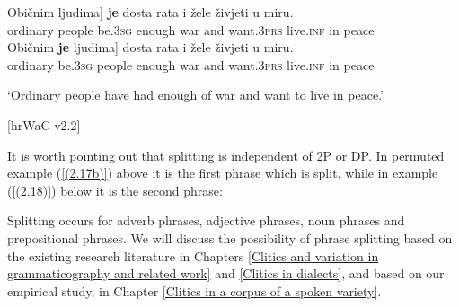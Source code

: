 \begin{exe}\ex
\begin{xlist}
\ex\label{(2.17a)}
\gll \minsp{[} Običnim ljudima] \textbf{je} dosta rata i žele živjeti u miru.  \\
{} ordinary people be\textsc{.3sg} enough war and want\textsc{.3prs} live\textsc{.inf} in peace \\
\ex\label{(2.17b)}
\gll \minsp{[} Običnim \textbf{je} ljudima] dosta rata i žele živjeti u miru.  \\
{} ordinary be\textsc{.3sg} people enough war and want\textsc{.3prs} live\textsc{.inf} in peace \\
\end{xlist}
\glt ‘Ordinary people have had enough of war and want to live in peace.’ \\
\strut\hfill [hrWaC v2.2]
\end{exe}

\noindent It is worth pointing out that splitting is independent of 2P or DP. In permuted example (\ref{(2.17b)}) above it is the first phrase which is split, while in example (\ref{(2.18)}) below it is the second phrase:


\noindent Splitting occurs for adverb phrases, adjective phrases, noun phrases and prepositional phrases. We will discuss the possibility of phrase splitting based on the existing research literature in Chapters \ref{Clitics and variation in grammaticography and related work} and \ref{Clitics in dialects}, and based on our empirical study, in Chapter \ref{Clitics in a corpus of a spoken variety}. 

